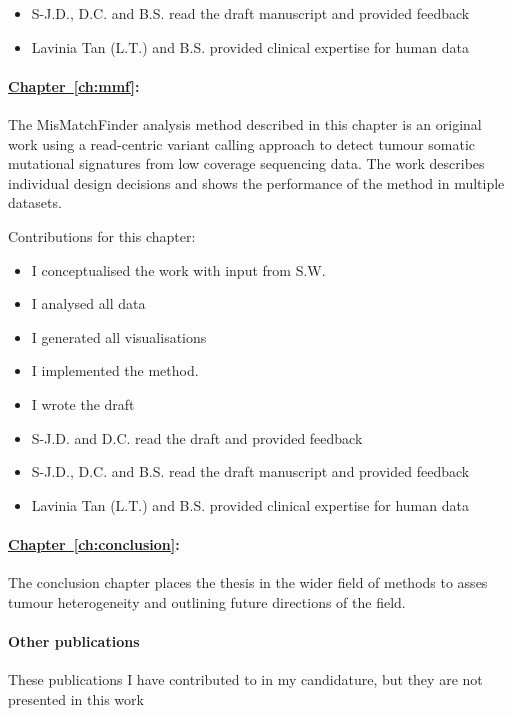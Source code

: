 {\begin{itemize}

	\item S-J.D., D.C. and  B.S. read the draft manuscript and provided feedback
	\item Lavinia Tan (L.T.) and B.S. provided clinical expertise for human data
	
\end{itemize}

\paragraph*{\hyperref[ch:mmf]{Chapter~\ref*{ch:mmf}}:}
The MisMatchFinder analysis method described in this chapter is an original work using a read-centric variant calling approach to detect tumour somatic mutational signatures from low coverage sequencing data. The work describes individual design decisions and shows the performance of the method in multiple datasets.

Contributions for this chapter:
\begin{itemize}
   	\item I conceptualised the work with input from S.W.
	\item I analysed all data
	\item I generated all visualisations
	\item I implemented the method.
	\item I wrote the draft
	\item S-J.D. and D.C. read the draft and provided feedback
	

	\item S-J.D., D.C. and  B.S. read the draft manuscript and provided feedback
	\item Lavinia Tan (L.T.) and B.S. provided clinical expertise for human data
	
\end{itemize}

\paragraph*{\hyperref[ch:conclusion]{Chapter~\ref*{ch:conclusion}}:}
The conclusion chapter places the thesis in the wider field of methods to asses tumour heterogeneity and outlining future directions of the field.

\hrulefill

\paragraph*{Other publications} These publications I have contributed to in my candidature, but they are not presented in this work

}
